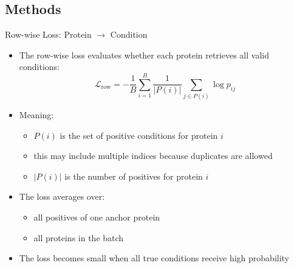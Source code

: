 \subsection{Methods}

\begin{frame}{Row-wise Loss: Protein \texorpdfstring{$\rightarrow$}{->} Condition}    
    \begin{itemize}
        \item The row-wise loss evaluates whether each protein retrieves all valid conditions:
        \[
            \mathcal{L}_{\text{row}} =
            - \frac{1}{B} \sum_{i=1}^{B}
            \frac{1}{|P(i)|}
            \sum_{j \in P(i)} \log p_{ij}
        \]
        \item Meaning:
        \begin{itemize}
            \item $P(i)$ is the set of positive conditions for protein $i$
            \item this may include multiple indices because duplicates are allowed
            \item $|P(i)|$ is the number of positives for protein $i$
        \end{itemize}
        \item The loss averages over:
        \begin{itemize}
            \item all positives of one anchor protein
            \item all proteins in the batch
        \end{itemize}
        \item The loss becomes small when all true conditions receive high probability
    \end{itemize}
    \label{frame:row_wise_loss}
\end{frame}

